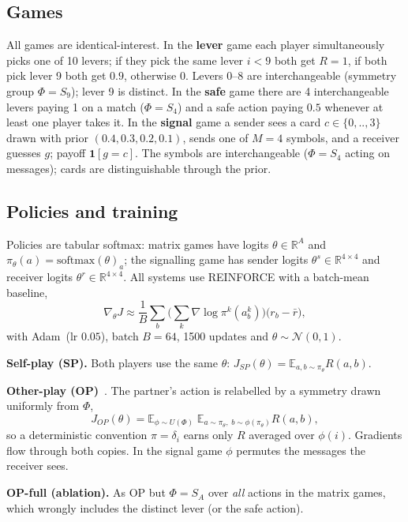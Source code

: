 \subsection{Games}
All games are identical-interest. In the \textbf{lever} game each player simultaneously picks one of 10 levers; if they pick the same lever $i<9$ both get $R=1$, if both pick lever 9 both get $0.9$, otherwise 0. Levers $0$--$8$ are interchangeable (symmetry group $\Phi=S_9$); lever 9 is distinct. In the \textbf{safe} game there are 4 interchangeable levers paying 1 on a match ($\Phi=S_4$) and a safe action paying $0.5$ whenever at least one player takes it. In the \textbf{signal} game a sender sees a card $c\in\{0,..,3\}$ drawn with prior $(0.4,0.3,0.2,0.1)$, sends one of $M=4$ symbols, and a receiver guesses $g$; payoff $\mathbf 1[g=c]$. The symbols are interchangeable ($\Phi=S_4$ acting on messages); cards are distinguishable through the prior.

\subsection{Policies and training}
Policies are tabular softmax: matrix games have logits $\theta\in\mathbb R^{A}$ and $\pi_\theta(a)=\mathrm{softmax}(\theta)_a$; the signalling game has sender logits $\theta^s\in\mathbb R^{4\times4}$ and receiver logits $\theta^r\in\mathbb R^{4\times4}$. All systems use REINFORCE with a batch-mean baseline,
\begin{equation}\nabla_\theta J\approx\frac1B\sum_{b}\Big(\sum_{k}\nabla\log\pi^{k}(a^k_b)\Big)\big(r_b-\bar r\big),\end{equation}
with Adam~(lr $0.05$), batch $B=64$, 1500 updates and $\theta\sim\mathcal N(0,1)$.

\textbf{Self-play (SP).} Both players use the same $\theta$: $J_{SP}(\theta)=\mathbb E_{a,b\sim\pi_\theta}R(a,b)$.

\textbf{Other-play (OP)}~\cite{hu2020other}. The partner's action is relabelled by a symmetry drawn uniformly from $\Phi$,
\begin{equation}J_{OP}(\theta)=\mathbb E_{\phi\sim U(\Phi)}\;\mathbb E_{a\sim\pi_\theta,\;b\sim\phi(\pi_\theta)}R(a,b),\end{equation}
so a deterministic convention $\pi=\delta_i$ earns only $R$ averaged over $\phi(i)$. Gradients flow through both copies. In the signal game $\phi$ permutes the messages the receiver sees.

\textbf{OP-full (ablation).} As OP but $\Phi=S_A$ over \emph{all} actions in the matrix games, which wrongly includes the distinct lever (or the safe action).

